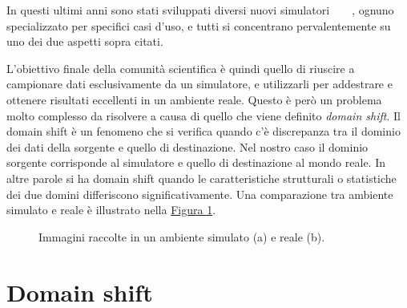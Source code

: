 \documentclass[12pt]{report}
\begin{document}
In questi ultimi anni sono stati sviluppati diversi nuovi simulatori~\cite{kolve2022ai2thorinteractive3denvironment}~\cite{NEURIPS2021_021bbc7e}~\cite{urakami2022doorgymscalabledooropening}~\cite{1389727}, ognuno specializzato per specifici casi d'uso, e tutti si concentrano pervalentemente su uno dei due aspetti sopra citati.

L'obiettivo finale della comunità scientifica è quindi quello di riuscire a campionare dati esclusivamente da un simulatore, e utilizzarli per addestrare e ottenere risultati eccellenti in un ambiente reale. Questo è però un problema molto complesso da risolvere a causa di quello che viene definito \textit{domain shift}. Il domain shift è un fenomeno che si verifica quando c'è discrepanza tra il dominio dei dati della sorgente e quello di destinazione. Nel nostro caso il dominio sorgente corrisponde al simulatore e quello di destinazione al mondo reale. In altre parole si ha domain shift quando le caratteristiche strutturali o statistiche dei due domini differiscono significativamente. Una comparazione tra ambiente simulato e reale è illustrato nella \hyperref[fig:immagine-simulata-reale]{Figura \ref{fig:immagine-simulata-reale}}.


\begin{figure}[t]
	\centering
	\hspace{0.01\textwidth}
	\caption{Immagini raccolte in un ambiente simulato (a) e reale (b).}
	\label{fig:immagine-simulata-reale}
\end{figure}

\section{Domain shift}
\label{sec:domain_shift}
\end{document}
